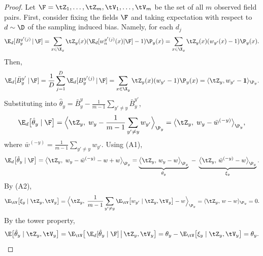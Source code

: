 \begin{proof}
  Let $\F = \tZ_1,\ldots,\tZ_m,\tV_1,\ldots,\tV_m$ be the set of all $m$ observed field pairs. First, consider fixing the fields $\F$ and taking expectation with respect to $d \sim \D$ of the sampling induced bias. Namely, for each $d_j$
  \begin{equation}
    \E_d[B_y^{y'(j)} \,|\, \F] 
    = \sum_{x\in\X_y}\tZ_y(x)(\E_d[w_n^{y'(j)}(x) | \F] - 1)\P_y(x)
    = \sum_{x\in\X_y}\tZ_y(x)(w_{y'}(x) - 1)\P_y(x).
  \end{equation}
Then, 
\begin{equation}
  \E_d[\bar{B}_y^{y'} \,|\, \F]
    = \frac1D\sum_{j=1}^{D} \E_d[B_y^{y'(j)} \,|\, \F]  
    = \sum_{x\in\X_y}\tZ_y(x)(w_{y'} - 1)\P_y(x)
    = \langle\tZ_y, w_{y'} - \mathbf{1}\rangle_{\P_y}.
  \end{equation}
Substituting into $\hat\theta_y = \bar B_y^{y} - \frac{1}{m-1}\sum_{y'\ne y}\bar B_y^{y'}$,
\begin{equation}
  \E_d\big[\hat\theta_y \mid \F\big]
  = \Big\langle \tZ_y,\; w_y - \frac{1}{m-1}\sum_{y'\ne y} w_{y'}\Big\rangle_{\P_y}
  = \big\langle \tZ_y,\; w_y - \bar w^{(-y)}\big\rangle_{\P_y},
\end{equation}
where $\bar w^{(-y)} = \frac{1}{m-1}\sum_{y'\ne y} w_{y'}$.
Using (A1),
\begin{equation}
  \E_d\big[\hat\theta_y \mid \F\big]
  = \big\langle \tZ_y,\; w_y - \bar w^{(-y)} - w + w\big\rangle_{\P_y}
   = \underbrace{\big\langle \tZ_y,\, w_y - w\big\rangle_{\P_y}}_{\theta_y}
  \;-\; \underbrace{\big\langle \tZ_y,\, \bar w^{(-y)} - w\big\rangle_{\P_y}}_{\xi_y}.
\end{equation}
By (A2),
\begin{equation}
  \E_{\tV}\big[\xi_y \mid \tZ_y,\tV_y\big]
  = \Big\langle \tZ_y,\; \frac{1}{m-1}\sum_{y'\ne y}\E_{\tV}\big[w_{y'} \mid \tZ_y,\tV_y\big] - w\Big\rangle_{\P_y}
  = \langle \tZ_y,\, w - w\rangle_{\P_y}
  = 0.
\end{equation}
By the tower property,
\begin{equation}
  \E\big[\hat\theta_y \mid \tZ_y,\tV_y\big]
  = \E_{\tV}\big[\, \E_d[\hat\theta_y \mid \F] \,\big|\, \tZ_y,\tV_y\big]
  = \theta_y - \E_{\tV}\big[\xi_y \mid \tZ_y,\tV_y\big]
  = \theta_y.
\end{equation}
\end{proof}

